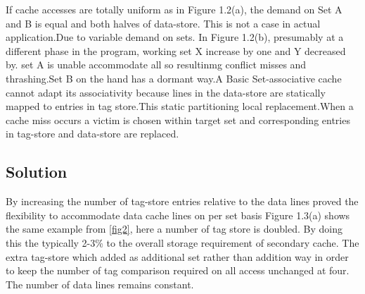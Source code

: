 \documentclass{report}
\begin{document}
If cache accesses are totally uniform as in Figure 1.2(a),
the demand on Set A and B is equal and both halves of data-store. This is not a case in actual application.Due to variable demand on sets. In Figure 1.2(b), presumably at a different phase in the program, working set X increase by one and Y decreased by.
set A is unable accommodate all so resultinmg conflict misses and thrashing.Set B on the hand has a dormant way.A Basic Set-associative cache cannot adapt its associativity because lines in the data-store are statically mapped to entries in tag store.This static partitioning local replacement.When a cache miss occurs a victim is chosen within target set and corresponding entries in tag-store and data-store are replaced.

\subsection{Solution}
By increasing the number of tag-store entries relative to the data lines proved the flexibility to accommodate data cache lines on per set basis Figure 1.3(a) shows the same example from \ref{fig2}, here a number of tag store is doubled. By doing this the typically 2-3\%  \vspace{.8cm}to the overall storage requirement of secondary cache.
The extra tag-store which added as additional set rather than addition way in order to keep the number of tag comparison required on all access unchanged at four. The number of data lines remains constant.
\end{document}
